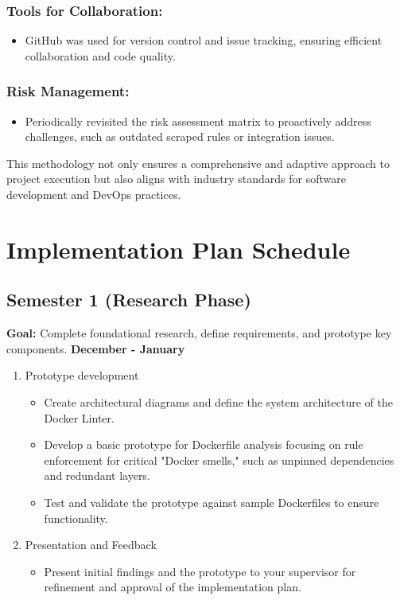\subsubsection{Tools for Collaboration:}
\begin{itemize}
    \item GitHub was used for version control and issue tracking, ensuring efficient collaboration and code quality.
\end{itemize}

\subsubsection{Risk Management:}
\begin{itemize}
    \item Periodically revisited the risk assessment matrix to proactively address challenges, such as outdated scraped rules or integration issues.
\end{itemize}

This methodology not only ensures a comprehensive and adaptive approach to project execution but also aligns with industry standards for software development and DevOps practices.

\section{Implementation Plan Schedule}
\subsection{Semester 1 (Research Phase)}
\textbf{Goal:} Complete foundational research, define requirements, and prototype key components.
\textbf{December - January} 
\begin{enumerate}
    \item Prototype development
    \begin{itemize}
        \item Create architectural diagrams and define the system architecture of the Docker Linter.
        \item Develop a basic prototype for Dockerfile analysis focusing on rule enforcement for critical "Docker smells," such as unpinned dependencies and redundant layers.
        \item Test and validate the prototype against sample Dockerfiles to ensure functionality.
    \end{itemize}
    \item Presentation and Feedback
    \begin{itemize}
        \item Present initial findings and the prototype to your supervisor for refinement and approval of the implementation plan.
    \end{itemize}
\end{enumerate}

